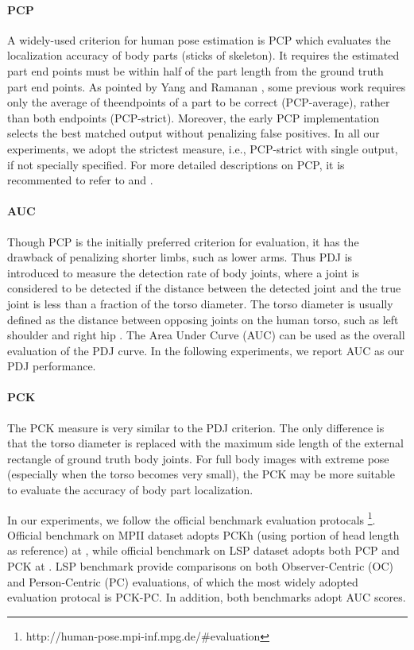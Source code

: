 \documentclass[journal ]{IEEEtran}
\begin{document}
\paragraph{PCP}
A widely-used criterion for human pose estimation is PCP which evaluates the localization accuracy of body parts (sticks of skeleton). It requires the estimated part end points must be within half of the part length from the ground truth part end points. As pointed by Yang and Ramanan \cite{yang2013articulated}, some previous work requires only the average of theendpoints of a part to be correct (PCP-average), rather than both endpoints (PCP-strict). Moreover, the early PCP implementation \cite{ferrari2008progressive} selects the best matched output without penalizing false positives. In all our experiments, we adopt the strictest measure, i.e., PCP-strict with single output, if not specially specified. For more detailed descriptions on PCP, it is recommented to refer to \cite{ferrari2008progressive} and \cite{yang2013articulated}.
\paragraph{AUC}
Though PCP is the initially preferred criterion for evaluation, it has the drawback of penalizing shorter limbs, such as lower arms. Thus PDJ is introduced \cite{toshev2014deeppose, sapp2013modec} to measure the detection rate of body joints, where a joint is considered to be detected if the distance between the detected joint and the true joint is less than a fraction of the torso diameter. The torso diameter is usually defined as the distance between opposing joints on the human torso, such as left shoulder and right hip \cite{toshev2014deeppose}. The Area Under Curve (AUC) can be used as the overall evaluation of the PDJ curve. In the following experiments, we report AUC as our PDJ performance.
\paragraph{PCK}
The PCK measure is very similar to the PDJ criterion. The only difference is that the torso diameter is replaced with the maximum side length of the external rectangle of ground truth body joints. For full body images with extreme pose (especially when the torso becomes very small), the PCK may be more suitable to evaluate the accuracy of body part localization.

In our experiments, we follow the official benchmark evaluation protocals \footnote{http://human-pose.mpi-inf.mpg.de/\#evaluation}. 
Official benchmark on MPII dataset adopts PCKh (using portion of head length as reference) at , while official benchmark on LSP dataset adopts both PCP and PCK at . LSP benchmark provide comparisons on both Observer-Centric (OC) and Person-Centric (PC) evaluations, of which the most widely adopted evaluation protocal is PCK-PC. In addition, both benchmarks adopt AUC scores.
\end{document}
